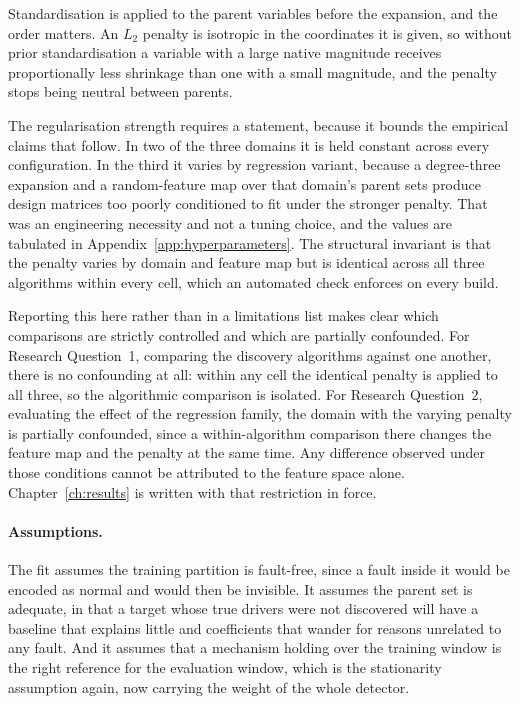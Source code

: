 Standardisation is applied to the parent variables before the expansion, and the order matters. An $L_2$ penalty is isotropic in the coordinates it is given, so without prior standardisation a variable with a large native magnitude receives proportionally less shrinkage than one with a small magnitude, and the penalty stops being neutral between parents.

The regularisation strength requires a statement, because it bounds the empirical claims that follow. In two of the three domains it is held constant across every configuration. In the third it varies by regression variant, because a degree-three expansion and a random-feature map over that domain's parent sets produce design matrices too poorly conditioned to fit under the stronger penalty. That was an engineering necessity and not a tuning choice, and the values are tabulated in Appendix~\ref{app:hyperparameters}. The structural invariant is that the penalty varies by domain and feature map but is identical across all three algorithms within every cell, which an automated check enforces on every build.

Reporting this here rather than in a limitations list makes clear which comparisons are strictly controlled and which are partially confounded. For Research Question~1, comparing the discovery algorithms against one another, there is no confounding at all: within any cell the identical penalty is applied to all three, so the algorithmic comparison is isolated. For Research Question~2, evaluating the effect of the regression family, the domain with the varying penalty is partially confounded, since a within-algorithm comparison there changes the feature map and the penalty at the same time. Any difference observed under those conditions cannot be attributed to the feature space alone. Chapter~\ref{ch:results} is written with that restriction in force.

\paragraph{Assumptions.} The fit assumes the training partition is fault-free, since a fault inside it would be encoded as normal and would then be invisible. It assumes the parent set is adequate, in that a target whose true drivers were not discovered will have a baseline that explains little and coefficients that wander for reasons unrelated to any fault. And it assumes that a mechanism holding over the training window is the right reference for the evaluation window, which is the stationarity assumption again, now carrying the weight of the whole detector.

